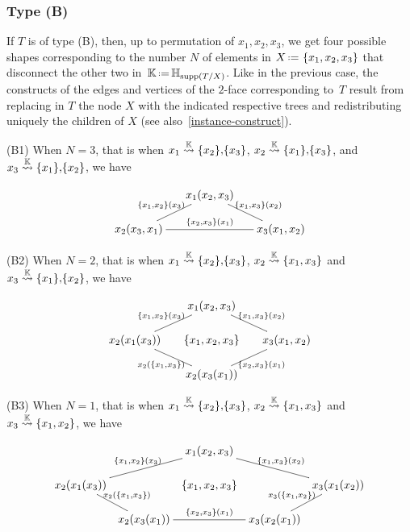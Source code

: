 \subsubsection*{Type (B)}
\label{ss:typeB}
If $T$ is of type (B), then, up to permutation of $x_1,x_2,x_3$, we get four possible shapes corresponding to the number $N$ of  elements in $X\eqdef \set{x_1,x_2,x_3}$ that disconnect the other two in~$\hyper{K}\eqdef \hyper{H}_{\supp(\occ{T}{X})}$.
Like in the previous case, the constructs of the edges and vertices of the $2$-face corresponding to~$T$ result from replacing in $T$ the node $X$ with the indicated respective trees and redistributing uniquely the  children of $X$ (see also~\cref{instance-construct}).
 
\smallskip\noindent
(B1)  When $N=3$, that is when $x_1\stackrel{{\mathbb K}}{\rightsquigarrow}\left\{x_2\right\}\!,\! \left\{x_3\right\}$, $x_2\stackrel{{\mathbb K}}{\rightsquigarrow}\left\{x_1\right\}\!,\! \left\{x_3\right\}$, and
 $x_3\stackrel{{\mathbb K}}{\rightsquigarrow}\left\{x_1\right\}\!,\! \left\{x_2\right\}$, we have
 
 $$\xymatrix @-1.65pc {&& x_1(x_2,x_3) \ar @{-}[ddll]_{\set{x_1,x_2}(x_3)} \ar @{-}[ddrr]^{\set{x_1,x_3}(x_2)}&& \\
 &&&&\\
 x_2(x_3,x_1) \ar @{-}[rrrr]^{\set{x_2,x_3}(x_1)} &&&& x_3(x_1,x_2)}$$

\smallskip\noindent
(B2) When $N=2$, that is when $x_1\stackrel{{\mathbb K}}{\rightsquigarrow}\left\{x_2\right\}\!,\! \left\{x_3\right\}$, $x_2\stackrel{{\mathbb K}}{\rightsquigarrow}\left\{x_1,x_3\right\}$ and
 $x_3\stackrel{{\mathbb K}}{\rightsquigarrow}\left\{x_1\right\}\!,\! \left\{x_2\right\}$, we have
 
 $$ \xymatrix @-1.65pc {&& x_1(x_2,x_3) \ar @{-}[ddll]_{\set{x_1,x_2}(x_3)} \ar @{-}[ddrr]^{\set{x_1,x_3}(x_2)}&& \\
 &&&&\\
 x_2(x_1(x_3)) \ar @{-}[ddrr]_{x_2(\set{x_1,x_3})}&& \set{x_1,x_2,x_3}  && x_3(x_1,x_2)\ar @{-}[ddll]^{\set{x_2,x_3}(x_1)}\\
 &&&&\\
 &&  x_2(x_3(x_1))&&}$$

\smallskip\noindent
(B3) When $N=1$, that is when $x_1\stackrel{{\mathbb K}}{\rightsquigarrow}\left\{x_2\right\}\!,\! \left\{x_3\right\}$, $x_2\stackrel{{\mathbb K}}{\rightsquigarrow}\left\{x_1,x_3\right\}$ and
 $x_3\stackrel{{\mathbb K}}{\rightsquigarrow}\left\{x_1,x_2\right\}$, we have
 
$$
 \xymatrix @-1.65pc {&& x_1(x_2,x_3) \ar @{-}[ddll]_{\set{x_1,x_2}(x_3)} \ar @{-}[ddrr]^{\set{x_1,x_3}(x_2)}&& \\
 &&&&\\
 x_2(x_1(x_3)) \ar @{-}[ddr]^{x_2(\set{x_1,x_3})}&& \set{x_1,x_2,x_3}  && x_3(x_1(x_2))\ar @{-}[ddl]_{x_3(\set{x_1,x_2})}\\
 &&&&\\
 &x_2(x_3(x_1))\ar @{-}[rr]^{\set{x_2,x_3}(x_1)}&  & x_3(x_2(x_1))&}
$$

